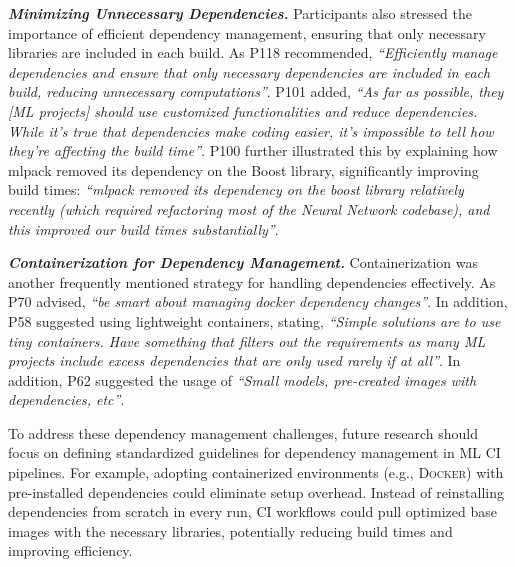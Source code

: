 \textit{\textbf{Minimizing Unnecessary Dependencies.}}
Participants also stressed the importance of efficient dependency management, ensuring that only necessary libraries are included in each build.
As P118 recommended, \textit{``Efficiently manage dependencies and ensure that only necessary dependencies are included in each build, reducing unnecessary computations''}. 
P101 added, \textit{``As far as possible, they [ML projects] should use customized functionalities and reduce dependencies. While it's true that dependencies make coding easier, it's impossible to tell how they're affecting the build time''}. P100 further illustrated this by explaining how mlpack removed its dependency on the Boost library, significantly improving build times: \textit{``mlpack removed its dependency on the boost library relatively recently (which required refactoring most of the Neural Network codebase), and this improved our build times substantially''}.

\textit{\textbf{Containerization for Dependency Management.}}
Containerization was another frequently mentioned strategy for handling dependencies effectively. As P70 advised, \textit{``be smart about managing docker dependency changes''}. In addition, P58 suggested using lightweight containers, stating, \textit{``Simple solutions are to use tiny containers. Have something that filters out the requirements as many ML projects include excess dependencies that are only used rarely if at all''}.
In addition, P62 suggested the usage of \textit{``Small models, pre-created images with dependencies, etc''}.

To address these dependency management challenges,
future research should focus on defining standardized guidelines for dependency management in ML CI pipelines. For example, adopting containerized environments (e.g., \textsc{Docker}) with pre-installed dependencies could eliminate setup overhead. Instead of reinstalling dependencies from scratch in every run, CI workflows could pull optimized base images with the necessary libraries, potentially reducing build times and improving efficiency.




